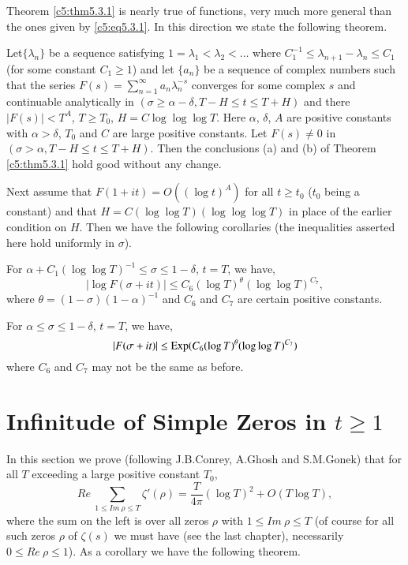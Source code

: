 Theorem \ref{c5:thm5.3.1} is nearly true of functions, very much
more general than the ones given by \eqref{c5:eq5.3.1}. In this
direction we state the following theorem.

\begin{theorem}\label{c5:thm5.3.2}
Let\pageoriginale $\{\lambda_{n}\}$ be a sequence satisfying
$1=\lambda_{1}<\lambda_{2}<\ldots$ where $C^{-1}_{1}\leq
\lambda_{n+1}-\lambda_{n}\leq C_{1}$ (for some constant $C_{1}\geq 1$)
and let $\{a_{n}\}$ be a sequence of complex numbers such that the
series $F(s)=\sum\limits^{\infty}_{n=1}a_{n}\lambda^{-s}_{n}$
converges for some complex $s$ and continuable analytically in
$(\sigma\geq \alpha-\delta, T-H\leq t\leq T+H)$ and there
$|F(s)|<T^{A}$, $T\geq T_{0}$, $H=C\log\log\log T$. Here $\alpha$,
$\delta$, $A$ are positive constants with $\alpha>\delta$, $T_{0}$ and
$C$ are large positive constants. Let $F(s)\neq 0$ in
$(\sigma>\alpha,T-H\leq t\leq T+H)$. Then the conclusions {\rm(a)} and
{\rm(b)} of Theorem \ref{c5:thm5.3.1} hold good without any change.
\end{theorem}

Next assume that $F(1+it)=O((\log t)^{A})$ for all $t\geq t_{0}$
($t_{0}$ being a constant) and that $H=C(\log\log T)(\log\log\log T)$
in place of the earlier condition on $H$. Then we have the following
corollaries (the inequalities asserted here hold uniformly in
$\sigma$).

\setcounter{corollary}{0}
\begin{corollary}\label{c5:addcoro1}
For $\alpha+C_{1}(\log\log T)^{-1}\leq \sigma\leq 1-\delta$, $t=T$, we
have, 
$$
|\log F(\sigma+it)|\leq C_{6}(\log T)^{\theta}(\log\log T)^{C_{7}},
$$
where $\theta=(1-\sigma)(1-\alpha)^{-1}$ and $C_{6}$ and $C_{7}$ are
certain positive constants.
\end{corollary}

\begin{corollary}\label{c5:addcoro2}
For $\alpha\leq \sigma\leq 1-\delta$, $t=T$, we have,
$$
|F(\sigma+it)|\leq \operatorname{Exp}(C_{6}(\log T)^{\theta}(\log\log T)^{C_{7}})
$$
where $C_{6}$ and $C_{7}$ may not be the same as before.
\end{corollary}

\section{Infinitude of Simple Zeros in $t\geq 1$}\label{c5:sec5.4}

In this section we prove (following J.B.\@ Conrey, A.\@ Ghosh and
S.M.\@ Gonek) that for all $T$ exceeding a large positive constant
$T_{0}$,
\begin{equation*}
Re\ \sum\limits_{1\leq Im\ \rho\leq T}\zeta'(\rho)=\frac{T}{4\pi}(\log
T)^{2}+O(T\log T),\tag{5.4.1}\label{c5:eq5.4.1}
\end{equation*}
where the sum on the left is over all zeros $\rho$ with $1\leq
Im\ \rho \leq T$ (of course for all such zeros $\rho$ of $\zeta(s)$ we
must have (see the last chapter), necessarily $0\leq Re\ \rho\leq
1$). As a corollary we have the following theorem. 

